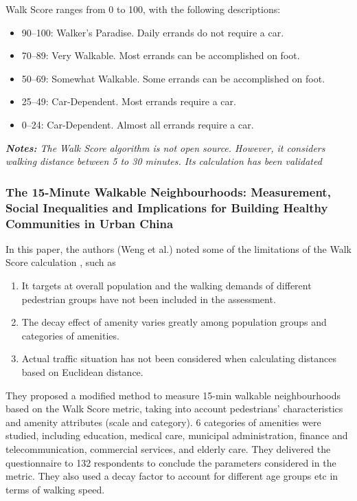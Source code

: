 Walk Score ranges from 0 to 100, with the following descriptions:

\begin{itemize}
    \item 90–100: Walker’s Paradise. Daily errands do not require a car.
    \item 70–89: Very Walkable. Most errands can be accomplished on foot.
    \item 50–69: Somewhat Walkable. Some errands can be accomplished on foot.
    \item 25–49: Car-Dependent. Most errands require a car.
    \item 0–24: Car-Dependent. Almost all errands require a car.
\end{itemize}

\textit{\textbf{Notes:} The Walk Score algorithm is not open source. However, it considers walking distance between 5 to 30 minutes. Its calculation has been validated \cite{carr_validation_2011}}

\subsubsection{The 15-Minute Walkable Neighbourhoods: Measurement, Social Inequalities and Implications for Building Healthy Communities in Urban China}

In this paper, the authors (Weng et al.) noted some of the limitations of the Walk Score calculation \cite{weng_15-minute_2019}, such as

\begin{enumerate}
    \item It targets at overall population and the walking demands of different pedestrian groups have not been included in the assessment.
    \item The decay effect of amenity varies greatly among population groups and categories of amenities.
    \item Actual traffic situation has not been considered when calculating distances based on Euclidean distance.
\end{enumerate}

They proposed a modified method to measure 15-min walkable neighbourhoods based on the Walk Score metric, taking into account pedestrians’ characteristics and amenity attributes (scale and category). 6 categories of amenities were studied, including education, medical care, municipal administration, finance and telecommunication, commercial services, and elderly care. They delivered the questionnaire to 132 respondents to conclude the parameters considered in the metric. They also used a decay factor to account for different age groups etc in terms of walking speed.

